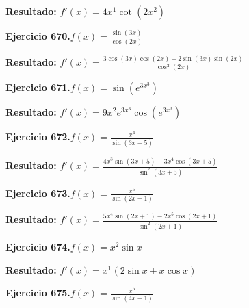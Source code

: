 \documentclass[10pt,a4paper]{article}
\begin{document}
\begin{solbox}
\textbf{Resultado:} \(\displaystyle f'(x) = 4x^{1}\cot(2x^{2})\)
\end{solbox}

\newpage
\begin{ejbox}
\textbf{Ejercicio 670.}\quad $f(x) = \frac{\sin(3x)}{\cos(2x)}$
\end{ejbox}

\begin{solbox}
\textbf{Resultado:} \(\displaystyle f'(x) = \frac{3\cos(3x)\cos(2x) + 2\sin(3x)\sin(2x)}{\cos^2(2x)}\)
\end{solbox}

\begin{ejbox}
\textbf{Ejercicio 671.}\quad $f(x) = \sin(e^{3x^{3}})$
\end{ejbox}

\begin{solbox}
\textbf{Resultado:} \(\displaystyle f'(x) = 9x^{2}e^{3x^{3}}\cos(e^{3x^{3}})\)
\end{solbox}

\begin{ejbox}
\textbf{Ejercicio 672.}\quad $f(x) = \frac{x^{4}}{\sin(3x +5)}$
\end{ejbox}

\begin{solbox}
\textbf{Resultado:} \(\displaystyle f'(x) = \frac{4x^{3}\sin(3x +5) - 3x^{4}\cos(3x +5)}{\sin^2(3x +5)}\)
\end{solbox}

\newpage
\begin{ejbox}
\textbf{Ejercicio 673.}\quad $f(x) = \frac{x^{5}}{\sin(2x +1)}$
\end{ejbox}

\begin{solbox}
\textbf{Resultado:} \(\displaystyle f'(x) = \frac{5x^{4}\sin(2x +1) - 2x^{5}\cos(2x +1)}{\sin^2(2x +1)}\)
\end{solbox}

\begin{ejbox}
\textbf{Ejercicio 674.}\quad $f(x) = x^{2} \sin x$
\end{ejbox}

\begin{solbox}
\textbf{Resultado:} \(\displaystyle f'(x) = x^{1}(2\sin x + x\cos x)\)
\end{solbox}

\begin{ejbox}
\textbf{Ejercicio 675.}\quad $f(x) = \frac{x^{5}}{\sin(4x -1)}$
\end{ejbox}
\end{document}
